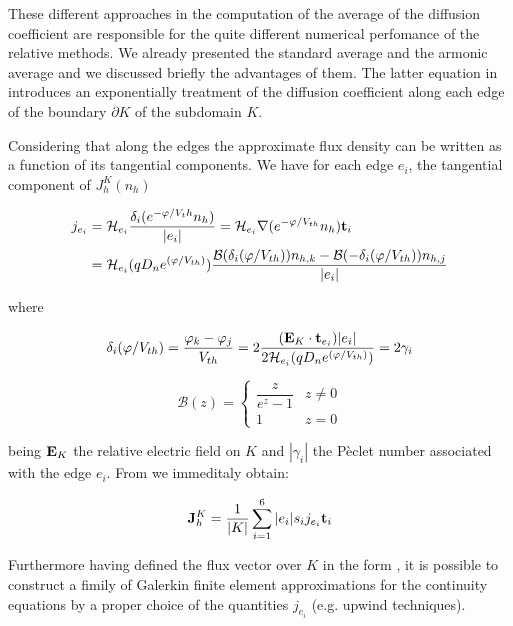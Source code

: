 These different approaches in the computation of the average of the diffusion coefficient are responsible for the quite different numerical perfomance of the relative methods.
We already presented the standard average and the armonic average and we discussed briefly the advantages of them. 
The latter equation in  introduces an exponentially treatment of the diffusion coefficient along each edge of the boundary $\partial K$ of the subdomain $K$. 

Considering that along the edges the approximate flux density can be written as a function of its tangential components. We have for each edge $e_i$, the tangential component of $J_h^K(n_h)$

\begin{align*}
j_{e_i}  & =   \mathcal{H}_{e_i} \dfrac{\delta_i(e^{-\varphi /V_th}n_h)}{|e_i|} = \mathcal{H}_{e_i} \nabla (e^{-\varphi / V_{th}}n_h) \mathbf{t}_i \\
& =  \mathcal{H}_{e_i}(qD_n e^{(\varphi/V_{th})}) \dfrac{\mathcal{B}(\delta_i(\varphi / V_{th}))n_{h,k} -  \mathcal{B}(-\delta_i(\varphi / V_{th}))n_{h,j}}{|e_i|}
\end{align*}

where 

\begin{equation}
\delta_i(\varphi / V_{th}) = \dfrac{\varphi_k - \varphi_j}{V_{th}} = 2 \dfrac{(\mathbf{E}_K\cdot \mathbf{t}_{e_i}) |e_i|}{2\mathcal{H}_{e_i}(qD_n e^{(\varphi/V_{th})}) } = 2 \gamma_i
\end{equation}

\begin{equation}
\mathcal{B}(z) = \left\{ \begin{array}{cl}
\dfrac{z}{e^z-1} & z \neq 0
\\
1 & z = 0
\end{array}
\right.
\end{equation}

being $\mathbf{E}_K$ the relative electric field on $K$ and $|\gamma_i|$ the P\`eclet number associated with the edge $e_i$. 
From  we immeditaly obtain:

\begin{equation}
\label{eq: exp fitted flux}
\mathbf{J}_h^K = \dfrac{1}{|K|}\sum_{i=1}^6 |e_i| s_i j_{e_i} \mathbf{t}_i 
\end{equation}

Furthermore having defined the flux vector over $K$ in the form , it is possible to construct a fimily of Galerkin finite element approximations for the continuity equations by a proper choice of the quantities $j_{e_i}$ (e.g. upwind techniques). 




